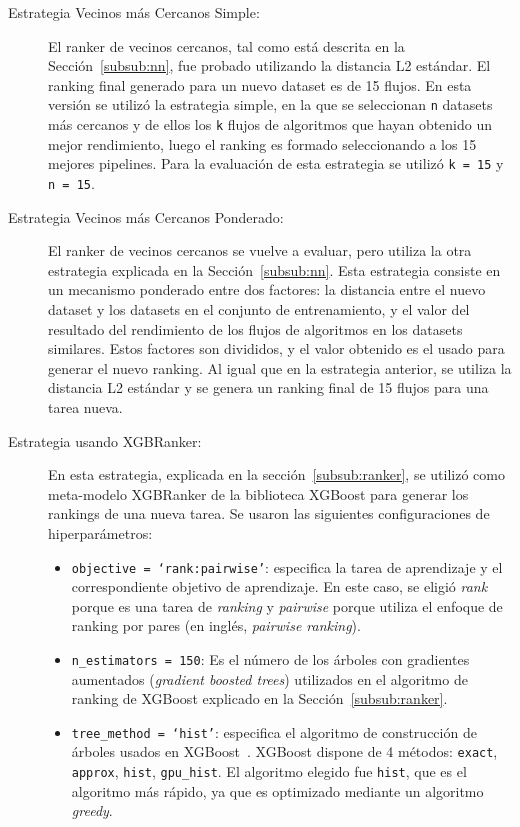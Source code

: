\begin{description}
	\item[Estrategia Vecinos más Cercanos Simple:] El ranker de vecinos cercanos, tal como está descrita en la Sección~\ref{subsub:nn}, fue probado utilizando la distancia L2 estándar. El ranking final generado para un nuevo dataset es de 15 flujos. En esta versión se utilizó la estrategia simple, en la que se seleccionan \texttt{n} datasets más cercanos y de ellos los \texttt{k} flujos de algoritmos que hayan obtenido un mejor rendimiento, luego el ranking es formado seleccionando a los 15 mejores pipelines. Para la evaluación de esta estrategia se utilizó \texttt{k = 15} y \texttt{n = 15}.
	\item[Estrategia Vecinos más Cercanos Ponderado:] El ranker de vecinos cercanos se vuelve a evaluar, pero utiliza la otra estrategia explicada en la Sección~\ref{subsub:nn}. Esta estrategia consiste en un mecanismo ponderado entre dos factores: la distancia entre el nuevo dataset y los datasets en el conjunto de entrenamiento, y el valor del resultado del rendimiento de los flujos de algoritmos en los datasets similares. Estos factores son divididos, y el valor obtenido es el usado para generar el nuevo ranking. Al igual que en la estrategia anterior, se utiliza la distancia L2 estándar y se genera un ranking final de 15 flujos para una tarea nueva.
	\item[Estrategia usando  XGBRanker:] En esta estrategia, explicada en la sección~\ref{subsub:ranker}, se utilizó como meta-modelo XGBRanker de la biblioteca XGBoost para generar los rankings de una nueva tarea. Se usaron las siguientes configuraciones de hiperparámetros: 	
	\begin{itemize}
		\item \texttt{objective = `rank:pairwise'}: especifica la tarea de aprendizaje y el correspondiente objetivo de aprendizaje. En este caso, se eligió \textit{rank} porque es una tarea de \textit{ranking} y \textit{pairwise} porque utiliza el enfoque de ranking por pares (en inglés, \textit{pairwise ranking}).
		\item \texttt{n\_estimators = 150}: Es el número de los árboles con gradientes aumentados (\textit{gradient boosted trees}) utilizados en el algoritmo de ranking de XGBoost explicado en la Sección~\ref{subsub:ranker}.
		\item \texttt{tree\_method = `hist'}: especifica el algoritmo de construcción de árboles usados en XGBoost~\cite{xgboost}. XGBoost dispone de 4 métodos: \texttt{exact}, \texttt{approx}, \texttt{hist}, \texttt{gpu\_hist}. El algoritmo elegido fue \texttt{hist}, que es el algoritmo más rápido, ya que es optimizado mediante un algoritmo \textit{greedy}.

\end{itemize}
\end{description}
